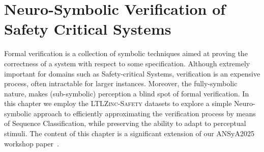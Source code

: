 \chapter{Neuro-Symbolic Verification of Safety Critical Systems}
\label{chap:ansya}

Formal verification is a collection of symbolic techniques aimed at proving the correctness of a system with respect to some specification. Although extremely important for domains such as Safety-critical Systems, verification is an expensive process, often intractable for larger instances. Moreover, the fully-symbolic nature, makes (sub-symbolic) perception a blind spot of formal verification. In this chapter we employ the \textsc{LTLZinc-Safety} datasets to explore a simple Neuro-symbolic approach to efficiently approximating the verification process by means of Sequence Classification, while preserving the ability to adapt to perceptual stimuli.
%
The content of this chapter is a significant extension of our ANSyA2025 workshop paper~\cite{lorello2025ansya}.

